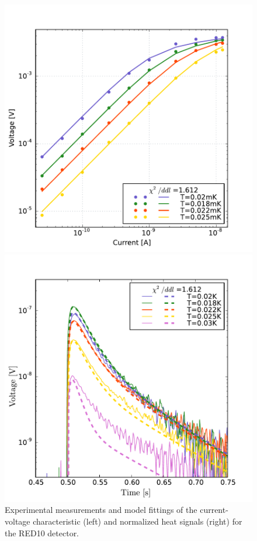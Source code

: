 \begin{figure}
\begin{minipage}{0.49\textwidth}
\includegraphics[width=\textwidth]{Figures/Ethem/v2i_red10.pdf}
\end{minipage}
\hfill
\begin{minipage}{0.49\textwidth}
\includegraphics[width=\textwidth]{Figures/Ethem/pulse_red10.pdf}
\end{minipage}
\caption{Experimental measurements and model fittings of the current-voltage characteristic (left) and normalized heat signals (right) for the RED10 detector.}
\label{fig:v2i-red10}
\end{figure}

